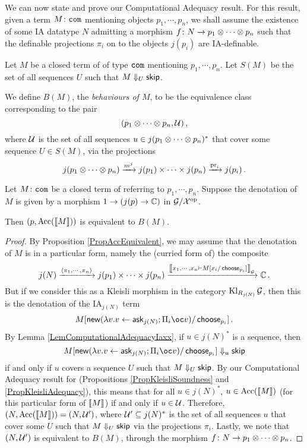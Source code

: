 We can now state and prove our Computational Adequacy result.
For this result, given a term $M\colon {\mathtt{com}}$ mentioning objects $p_1,\cdots,p_n$, we shall assume the existence of some IA datatype $N$ admitting a morphism $f \colon N \to p_1 \otimes \cdots \otimes p_n$ such that the definable projections $\pi_i$ on to the objects $j(p_i)$ are IA-definable.

\begin{definition}
  Let $M$ be a closed term of \IAXX of type ${\mathtt{com}}$ mentioning $p_1,\cdots,p_n$.
  Let $S(M)$ be the set of all sequences $U$ such that $M\Downarrow_U{\mathsf{skip}}$.

  We define $B(M)$, the \emph{behaviours of $M$}, to be the equivalence class corresponding to the pair
  \[
    (p_1\otimes \cdots \otimes p_n, \mathcal U)\,,
    \]
  where $\mathcal U$ is the set of all sequences $u\in j(p_1\otimes \cdots \otimes p_n)^*$ that cover some sequence $U\in S(M)$, via the projections
  \[
    j(p_1\otimes \cdots \otimes p_n) \xrightarrow{m^j} j(p_1) \times \cdots \times j(p_n) \xrightarrow{\operatorname{pr}_i} j(p_i)\,.
    \]
\end{definition}


\begin{theorem}
  Let $M \colon {\mathtt{com}}$ be a closed term of \IAXX referring to $p_1,\cdots,p_n$.  
  Suppose the denotation of $M$ is given by a morphism $1 \to (j(p) \to \mathbb{C})$ in $\mathcal G/\mathcal X^{\mathrm{op}}$.  

  Then $(p,\operatorname{Acc}(\left\llbracket M\right\rrbracket))$ is equivalent to $B(M)$.
  \label{TheComputationalAdequacyIAXX}
\end{theorem}
\begin{proof}
  By Proposition \ref{PropAccEquivalent}, we may assume that the denotation of $M$ is in a particular form, namely the (curried form of) the composite
  \[
    j(N) \xrightarrow{\langle\pi_1,\cdots,\pi_n\rangle} j(p_1) \times \cdots \times j(p_n) \xrightarrow{\left\llbracket x_1,\cdots,x_n\mathbin{\vdash} M[x_i/\operatorname{\mathsf{choose}}_{p_i}]\right\rrbracket_\mathcal G} \mathbb{C}\,.
    \]
  But if we consider this as a Kleisli morphism in the category $\operatorname{Kl}_{R_{j(N)}}\mathcal G$, then this is the denotation of the IA${}_{j(N)}$ term
  \[
    M[\neww(\lambda v.v\gets \ask_{j(N)};\Pi_i\oc v)/\choose_{p_i}]\,.
    \]
  By Lemma \ref{LemComputationalAdequacyIaxx}, if $u\in j(N)^*$ is a sequence, then
  \[
    M[\neww(\lambda v.v\gets \ask_{j(N)};\Pi_i\oc v)/\choose_{p_i}]\converges_u \skipp
    \]
  if and only if $u$ covers a sequence $U$ such that $M\Downarrow_U{\mathsf{skip}}$.
  By our Computational Adequacy result for \IAX (Propositions \ref{PropKleisliSoundness} and \ref{PropKleisliAdequacy}), this means that for all $u\in j(N)^*$, $u\in \operatorname{Acc}(\left\llbracket M\right\rrbracket)$ (for this particular form of $\left\llbracket M\right\rrbracket$) if and only if $u\in \mathcal U$.
  Therefore, $(N,\operatorname{Acc}(\left\llbracket M\right\rrbracket)) = (N,\mathcal U')$, where $\mathcal U'\subseteq j(N)^*$ is the set of all sequences $u$ that cover some $U$ such that $M\Downarrow_U{\mathsf{skip}}$ via the projections $\pi_i$.
  Lastly, we note that $(N,\mathcal U')$ is equivalent to $B(M)$, through the morphism $f\colon N \to p_1\otimes\cdots\otimes p_n$.
\end{proof}

